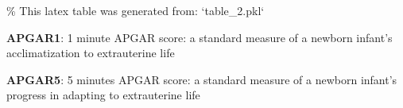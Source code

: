 \documentclass[11pt]{article}
\begin{document}
\begin{codeoutput}
\% This latex table was generated from: `table\_2.pkl`
\begin{table}[h]
\caption{Difference in APGAR scores between pre and post intervention groups using independent t-test}
\label{table:difference\_tests}
\begin{threeparttable}
\renewcommand{\TPTminimum}{\linewidth}
\begin{tablenotes}
\footnotesize
\item \textbf{APGAR1}: 1 minute APGAR score: a standard measure of a newborn infant's acclimatization to extrauterine life
\item \textbf{APGAR5}: 5 minutes APGAR score: a standard measure of a newborn infant's progress in adapting to extrauterine life
\end{tablenotes}
\end{threeparttable}
\end{table}
\end{codeoutput}
\end{document}
